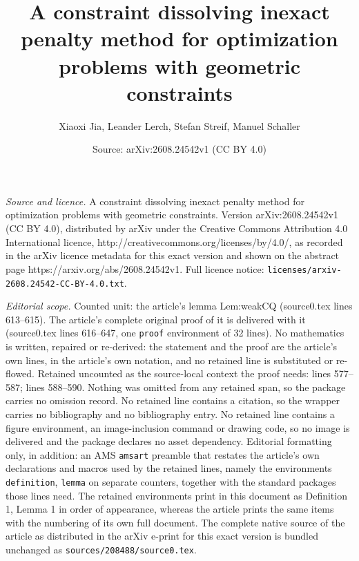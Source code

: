 \documentclass[10pt,a4paper]{amsart}
\title{A constraint dissolving inexact penalty method for optimization problems with geometric constraints}
\author{Xiaoxi Jia, Leander Lerch, Stefan Streif, Manuel Schaller}
\date{Source: arXiv:2608.24542v1 (CC BY 4.0)}
\begin{document}
\maketitle

\noindent\emph{Source and licence.} A constraint dissolving inexact penalty method for optimization problems with geometric constraints. Version arXiv:2608.24542v1 (CC BY 4.0), distributed by arXiv under the Creative Commons Attribution 4.0 International licence, http://creativecommons.org/licenses/by/4.0/, as recorded in the arXiv licence metadata for this exact version and shown on the abstract page https://arxiv.org/abs/2608.24542v1. Full licence notice: \texttt{licenses/arxiv-2608.24542-CC-BY-4.0.txt}.\par\smallskip

\noindent\textit{Editorial scope.} Counted unit: the article's lemma Lem:weakCQ (source0.tex lines 613--615). The article's complete original proof of it is delivered with it (source0.tex lines 616--647, one \texttt{proof} environment of 32 lines). No mathematics is written, repaired or re-derived: the statement and the proof are the article's own lines, in the article's own notation, and no retained line is substituted or re-flowed.  Retained uncounted as the source-local context the proof needs: lines 577--587; lines 588--590.  Nothing was omitted from any retained span, so the package carries no omission record.  No retained line contains a citation, so the wrapper carries no bibliography and no bibliography entry.  No retained line contains a figure environment, an image-inclusion command or drawing code, so no image is delivered and the package declares no asset dependency.  Editorial formatting only, in addition: an AMS \texttt{amsart} preamble that restates the article's own declarations and macros used by the retained lines, namely the environments \texttt{definition}, \texttt{lemma} on separate counters, together with the standard packages those lines need.  The retained environments print in this document as Definition 1, Lemma 1 in order of appearance, whereas the article prints the same items with the numbering of its own full document.  The complete native source of the article as distributed in the arXiv e-print for this exact version is bundled unchanged as \texttt{sources/208488/source0.tex}.
\end{document}

